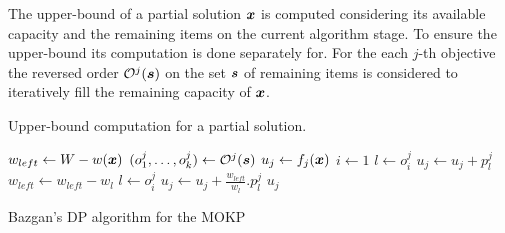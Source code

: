 The upper-bound of a partial solution $\boldsymbol{x}$ is computed considering
its available capacity and the remaining items on the current algorithm stage.
To ensure the upper-bound its computation is done separately for.
For the each $j$-th objective the reversed order $\mathcal{O}^j({\boldsymbol{s}})$ on
the set $\boldsymbol{s}$ of remaining items is considered to iteratively fill the
remaining capacity of $\boldsymbol{x}$.

\begin{algorithm}
  \caption{Upper-bound computation for a partial solution.}
  \label{alg:ub}
  \begin{algorithmic}[1]
      \State $w_{left} \gets W - w(\boldsymbol{x})$
      \State $(o^j_1, \ldots, o^j_k) \gets \mathcal{O}^j(\boldsymbol{s})$
      \State $u_j \gets f_j(\boldsymbol{x})$
      \State $i \gets 1$
      \State $l \gets o^j_i$
        \State $u_j \gets u_j + p^j_{l}$
        \State $w_{left} \gets w_{left} - w_l$
      \EndWhile
        \State $l \gets o^j_i$
        \State $u_j \gets u_j + \frac{w_{left}}{w_l}.p^j_{l}$
      \EndIf
      \State \Return $u_j$
    \EndFunction
  \end{algorithmic}
\end{algorithm}


\begin{algorithm}
  \caption{Bazgan's DP algorithm for the MOKP}
  \label{alg:bazgan}
  
\end{algorithm}


